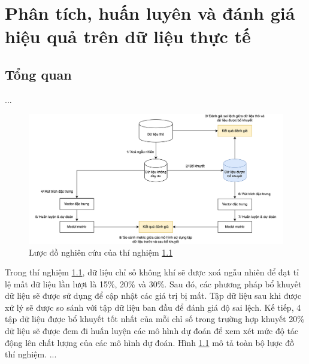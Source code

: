 \chapter{Phân tích, huấn luyên và đánh giá hiệu quả trên dữ liệu thực tế}
\section{Tổng quan}\label{ex-1}
...

\begin{figure}[h]
    \centering
    \includegraphics[width=\linewidth]{image/section6_1/experiment.drawio.png}
    \caption{Lược đồ nghiên cứu của thí nghiệm \ref{ex-1}}
    \label{fig:section6_1-experiment}
\end{figure}
Trong thí nghiệm \ref{ex-1}, dữ liệu chỉ số không khí sẽ được xoá ngẫu nhiên để đạt tỉ lệ mất dữ liệu lần lượt là 15\%, 20\% và 30\%. Sau đó, các phương pháp bổ khuyết dữ liệu sẽ được sử dụng để cập nhật các giá trị bị mất. Tập dữ liệu sau khi được xử lý sẽ được so sánh với tập dữ liệu ban đầu để đánh giá độ sai lệch. Kế tiếp, 4 tập dữ liệu được bổ khuyết tốt nhất của mỗi chỉ số trong trường hợp khuyết 20\% dữ liệu sẽ được đem đi huấn luyện các mô hình dự đoán để xem xét mức độ tác động lên chất lượng của các mô hình dự đoán. Hình \ref{fig:section6_1-experiment} mô tả toàn bộ lược đồ thí nghiệm.
...







